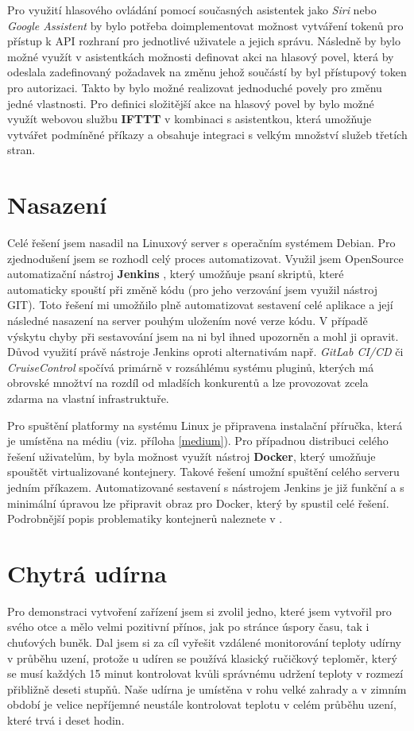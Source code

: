 Pro využití hlasového ovládání pomocí současných asistentek jako \textit{Siri} nebo \textit{Google Assistent} by bylo potřeba doimplementovat možnost vytváření tokenů pro přístup k API rozhraní pro jednotlivé uživatele a jejich správu. Následně by bylo možné využít v asistentkách možnosti definovat akci na hlasový povel, která by odeslala zadefinovaný požadavek na změnu jehož součástí by byl přístupový token pro autorizaci. Takto by bylo možné realizovat jednoduché povely pro změnu jedné vlastnosti. Pro definici složitější akce na hlasový povel by bylo možné využít webovou službu \textbf{IFTTT} \cite{ifttt} v kombinaci s asistentkou, která umožňuje vytvářet podmíněné příkazy a obsahuje integraci s velkým množství služeb třetích stran.


\section{Nasazení}
Celé řešení jsem nasadil na Linuxový server s operačním systémem Debian. Pro zjednodušení jsem se rozhodl celý proces automatizovat. Využil jsem OpenSource automatizační nástroj \textbf{Jenkins} \cite{jenkins}, který umožňuje psaní skriptů, které automaticky spouští při změně kódu (pro jeho verzování jsem využil nástroj GIT). Toto řešení mi umožňilo plně automatizovat sestavení celé aplikace a její následné nasazení na server pouhým uložením nové verze kódu. V případě výskytu chyby při sestavování jsem na ni byl ihned upozorněn a mohl ji opravit. Důvod využití právě nástroje Jenkins oproti alternativám např. \textit{GitLab CI/CD} či \textit{CruiseControl} spočívá primárně v rozsáhlému systému pluginů, kterých má obrovské množtví na rozdíl od mladších konkurentů a lze provozovat zcela zdarma na vlastní infrastruktuře.

Pro spuštění platformy na systému Linux je připravena instalační příručka, která je umístěna na médiu (viz. příloha \ref{medium}). Pro případnou distribuci celého řešení uživatelům, by byla možnost využít nástroj \textbf{Docker}, který umožňuje spouštět virtualizované kontejnery. Takové řešení umožní spuštění celého serveru jedním příkazem. Automatizované sestavení s nástrojem Jenkins je již funkční a s minimální úpravou lze připravit obraz pro Docker, který by spustil celé řešení. Podrobnější popis problematiky kontejnerů naleznete v \cite{containers}.



\section{Chytrá udírna}
Pro demonstraci vytvoření zařízení jsem si zvolil jedno, které jsem vytvořil pro svého otce a mělo velmi pozitivní přínos, jak po stránce úspory času, tak i chuťových buněk. Dal jsem si za cíl vyřešit vzdálené monitorování teploty udírny v průběhu uzení, protože u udíren se používá klasický ručičkový teploměr, který se musí každých 15 minut kontrolovat kvůli správnému udržení teploty v rozmezí přibližně deseti stupňů. Naše udírna je umístěna v rohu velké zahrady a v zimním období je velice nepříjemné neustále kontrolovat teplotu v celém průběhu uzení, které trvá i deset hodin.

